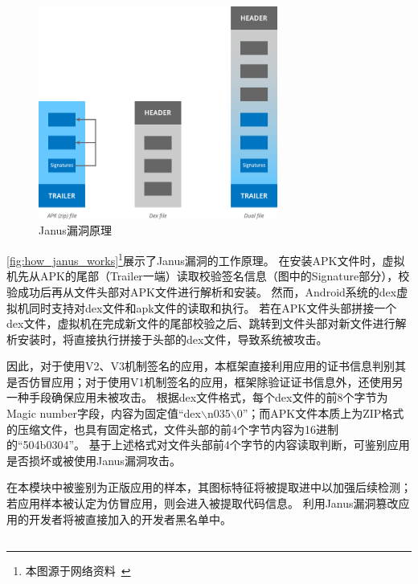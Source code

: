 \begin{figure}[htbp]
    \centering
    \includegraphics[width=0.7\textwidth]{./Figures/edwin-janus}
    \caption{Janus漏洞原理}
    \label{fig:how_janus_works}
    \vspace{-3mm}
\end{figure}

\autoref{fig:how_janus_works}\footnote{本图源于网络资料~\cite{CVE_2017_13156}}展示了Janus漏洞的工作原理。
在安装APK文件时，虚拟机先从APK的尾部（Trailer一端）读取校验签名信息（图中的Signature部分），校验成功后再从文件头部对APK文件进行解析和安装。
然而，Android系统的dex虚拟机同时支持对dex文件和apk文件的读取和执行。
若在APK文件头部拼接一个dex文件，虚拟机在完成新文件的尾部校验之后、跳转到文件头部对新文件进行解析安装时，将直接执行拼接于头部的dex文件，导致系统被攻击。

因此，对于使用V2、V3机制签名的应用，本框架直接利用应用的证书信息判别其是否仿冒应用；对于使用V1机制签名的应用，框架除验证证书信息外，还使用另一种手段确保应用未被攻击。
根据dex文件格式，每个dex文件的前8个字节为Magic number字段，内容为固定值``dex$\backslash$n035$\backslash$0''；而APK文件本质上为ZIP格式的压缩文件，也具有固定格式，文件头部的前4个字节内容为16进制的``504b0304''。
基于上述格式对文件头部前4个字节的内容读取判断，可鉴别应用是否损坏或被使用Janus漏洞攻击。

在本模块中被鉴别为正版应用的样本，其图标特征将被提取进\componentE 中以加强后续检测；若应用样本被认定为仿冒应用，则会进入\componentC 被提取代码信息。
利用Janus漏洞篡改应用的开发者将被直接加入\componentE 的开发者黑名单中。

\subsection{\componentC }

